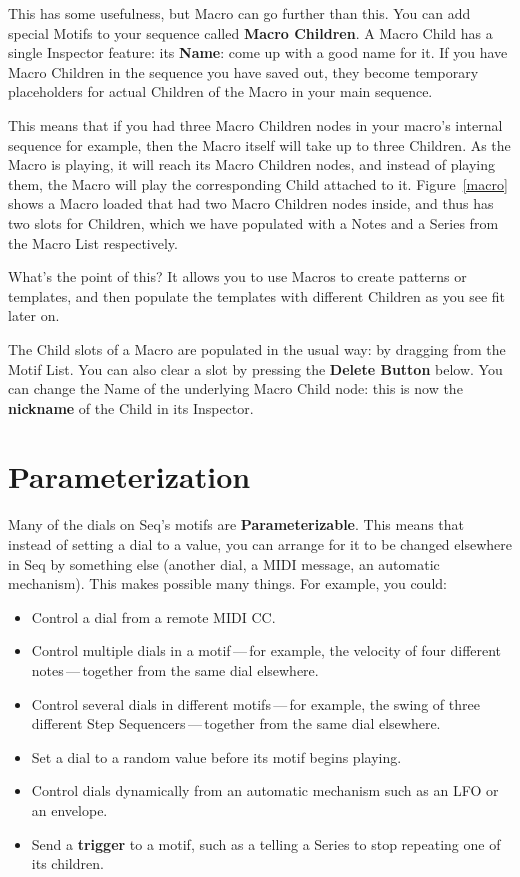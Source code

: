 \documentclass[twoside,10pt]{article}
\begin{document}
This has some usefulness, but Macro can go further than this.  You can add special Motifs to your sequence called {\bf Macro Children}.  A Macro Child has a single Inspector feature: its {\bf Name}: come up with a good name for it.  If you have Macro Children in the sequence you have saved out, they become temporary placeholders for actual Children of the Macro in  your main sequence.

This means that if you had three Macro Children nodes in your macro's internal sequence for example, then the Macro itself will take up to three Children.  As the Macro is playing, it will reach its Macro Children nodes, and instead of playing them, the Macro will play the corresponding Child attached to it.  Figure~\ref{macro} shows a Macro loaded that had two Macro Children nodes inside, and thus has two slots for Children, which we have populated with a Notes and a Series from the Macro List respectively.

What's the point of this?  It allows you to use Macros to create patterns or templates, and then populate the templates with different Children as you see fit later on. 

The Child slots of a Macro are populated in the usual way: by dragging from the Motif List.  You can also clear a slot by pressing the {\bf Delete Button} below.  You can change the Name of the underlying Macro Child node: this is now the {\bf nickname} of the Child in its Inspector.

\clearpage\section{Parameterization}
\label{parameters}

Many of the dials on Seq's motifs are {\bf Parameterizable}.  This means that instead of setting a dial to a value, you can arrange for it to be changed elsewhere in Seq by something else (another dial, a MIDI message, an automatic mechanism).  This makes possible many things.  For example, you could:

\begin{itemize}
\item Control a dial from a remote MIDI CC.
\item Control multiple dials in a motif\,---\,for example, the velocity of four different notes\,---\,together from the same dial elsewhere.
\item Control several dials in different motifs\,---\,for example, the swing of three different Step Sequencers\,---\,together from the same dial elsewhere.
\item Set a dial to a random value before its motif begins playing.
\item Control dials dynamically from an automatic mechanism such as an LFO or an envelope.
\item Send a {\bf trigger} to a motif, such as a telling a Series to stop repeating one of its children.
\end{itemize}
\end{document}
